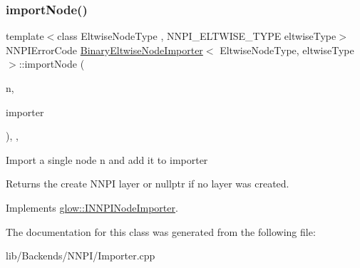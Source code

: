 \subsubsection{\texorpdfstring{import\+Node()}{importNode()}}
{\footnotesize\ttfamily template$<$class Eltwise\+Node\+Type , N\+N\+P\+I\+\_\+\+E\+L\+T\+W\+I\+S\+E\+\_\+\+T\+Y\+PE eltwise\+Type$>$ \\
N\+N\+P\+I\+Error\+Code \hyperlink{class_binary_eltwise_node_importer}{Binary\+Eltwise\+Node\+Importer}$<$ Eltwise\+Node\+Type, eltwise\+Type $>$\+::import\+Node (\begin{DoxyParamCaption}\item[{\hyperlink{classglow_1_1_node}{Node} $\ast$}]{n,  }\item[{\hyperlink{classglow_1_1_n_n_p_i_importer}{N\+N\+P\+I\+Importer} \&}]{importer }\end{DoxyParamCaption})\hspace{0.3cm}{\ttfamily [inline]}, {\ttfamily [override]}, {\ttfamily [virtual]}}

Import a single node {\ttfamily n} and add it to {\ttfamily importer} \begin{DoxyReturn}{Returns}
the create N\+N\+PI layer or nullptr if no layer was created. 
\end{DoxyReturn}


Implements \hyperlink{classglow_1_1_i_n_n_p_i_node_importer_aa861e10cb0c17a92abb94bf613b57807}{glow\+::\+I\+N\+N\+P\+I\+Node\+Importer}.



The documentation for this class was generated from the following file\+:\begin{DoxyCompactItemize}
\item 
lib/\+Backends/\+N\+N\+P\+I/Importer.\+cpp\end{DoxyCompactItemize}
